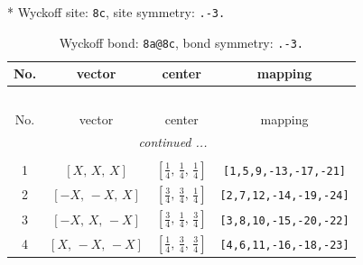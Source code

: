 \documentclass[fleqn,8pt]{jsarticle}
\begin{document}
* Wyckoff site: {\tt 8c}, site symmetry: {\tt .-3.}
\renewcommand{\arraystretch}{1.2}
\begin{longtable}{cccc}
\caption{Wyckoff bond: {\tt 8a@8c}, bond symmetry: {\tt .-3.}}
 \\
 \hline \hline
No. & vector & center & mapping \\ \hline \endfirsthead

\multicolumn{3}{l}{\tablename\ \thetable{}} \\
 \hline \hline
No. & vector & center & mapping \\ \hline \endhead

 \hline \hline
\multicolumn{3}{r}{\footnotesize\it continued ...} \\ \endfoot

 \hline \hline
\multicolumn{3}{r}{} \\ \endlastfoot

1 & $\left[ X,\, X,\, X \right]$ & $\left[ \frac{1}{4},\, \frac{1}{4},\, \frac{1}{4} \right]$ & {\tt [1,5,9,-13,-17,-21]} \\ \hline
2 & $\left[ - X,\, - X,\, X \right]$ & $\left[ \frac{3}{4},\, \frac{3}{4},\, \frac{1}{4} \right]$ & {\tt [2,7,12,-14,-19,-24]} \\ \hline
3 & $\left[ - X,\, X,\, - X \right]$ & $\left[ \frac{3}{4},\, \frac{1}{4},\, \frac{3}{4} \right]$ & {\tt [3,8,10,-15,-20,-22]} \\ \hline
4 & $\left[ X,\, - X,\, - X \right]$ & $\left[ \frac{1}{4},\, \frac{3}{4},\, \frac{3}{4} \right]$ & {\tt [4,6,11,-16,-18,-23]} \\
\end{longtable}
\renewcommand{\arraystretch}{1.2}
\end{document}
